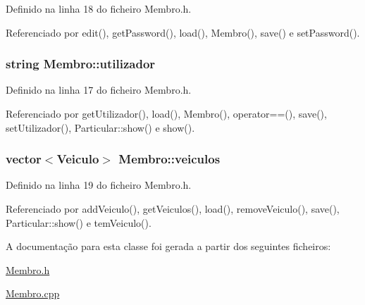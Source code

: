 Definido na linha 18 do ficheiro Membro.\+h.



Referenciado por edit(), get\+Password(), load(), Membro(), save() e set\+Password().

\hypertarget{class_membro_a42cc733ff94ec8d1bbfdacc62dfbb0e7}{
\subsubsection[{utilizador}]{\setlength{\rightskip}{0pt plus 5cm}string Membro\+::utilizador\hspace{0.3cm}{\ttfamily [protected]}}}\label{class_membro_a42cc733ff94ec8d1bbfdacc62dfbb0e7}


Definido na linha 17 do ficheiro Membro.\+h.



Referenciado por get\+Utilizador(), load(), Membro(), operator==(), save(), set\+Utilizador(), Particular\+::show() e show().

\hypertarget{class_membro_a7485fc8a9f992a05662866f19b22f74a}{
\subsubsection[{veiculos}]{\setlength{\rightskip}{0pt plus 5cm}vector$<${\bf Veiculo}$>$ Membro\+::veiculos\hspace{0.3cm}{\ttfamily [protected]}}}\label{class_membro_a7485fc8a9f992a05662866f19b22f74a}


Definido na linha 19 do ficheiro Membro.\+h.



Referenciado por add\+Veiculo(), get\+Veiculos(), load(), remove\+Veiculo(), save(), Particular\+::show() e tem\+Veiculo().



A documentação para esta classe foi gerada a partir dos seguintes ficheiros\+:\begin{DoxyCompactItemize}
\item 
\hyperlink{_membro_8h}{Membro.\+h}\item 
\hyperlink{_membro_8cpp}{Membro.\+cpp}\end{DoxyCompactItemize}
